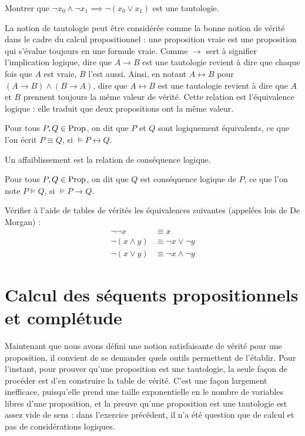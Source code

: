 \begin{exercise}
  Montrer que $\lnot x_0\land \lnot x_1 \implies \lnot (x_0\lor x_1)$ est une
  tautologie.
\end{exercise}

La notion de tautologie peut être considérée comme la bonne notion de vérité
dans le cadre du calcul propositionnel : une proposition vraie est une
proposition qui s'évalue toujours en une formule vraie. Comme $\to$ sert à
signifier l'implication logique, dire que $A \to B$ est une tautologie revient à
dire que chaque fois que $A$ est vraie, $B$ l'est aussi. Ainsi, en notant
$A \leftrightarrow B$ pour $(A \to B) \land (B \to A)$, dire que
$A \leftrightarrow B$ est une tautologie revient à dire que $A$ et $B$ prennent
toujours la même valeur de vérité. Cette relation est l'équivalence logique :
elle traduit que deux propositions ont la même valeur.

\begin{definition}
  Pour tous $P,Q\in\operatorname{Prop}$, on dit que $P$ et $Q$ sont logiquement équivalents,
  ce que l'on écrit $P\equiv Q$, si $\models P \leftrightarrow Q$.
\end{definition}

Un affaiblissement est la relation de conséquence logique.

\begin{definition}
  Pour tous $P,Q\in\operatorname{Prop}$, on dit que $Q$ est conséquence logique de $P$, ce que
  l'on note $P\vDash Q$, si $\models P\to Q$.
\end{definition}

\begin{exercise}
  Vérifier à l'aide de tables de vérités les équivalences suivantes (appelées
  lois de De Morgan) :
  \begin{align*}
    \lnot\lnot x &\equiv x\\
    \lnot (x \land y) &\equiv \lnot x \lor \lnot y\\
    \lnot (x \lor y) &\equiv \lnot x \land \lnot y
  \end{align*}
\end{exercise}

\section[Séquents propositionnels]{Calcul des séquents propositionnels et
  complétude}

Maintenant que nous avons défini une notion satisfaisante de vérité pour une
proposition, il convient de se demander quels outils permettent de l'établir.
Pour l'instant, pour prouver qu'une proposition est une tautologie, la seule
façon de procéder est d'en construire la table de vérité. C'est une façon
largement inefficace, puisqu'elle prend une taille exponentielle en le nombre de
variables libres d'une proposition, et la preuve qu'une proposition est une
tautologie est assez vide de sens : dans l'exercice précédent, il n'a été
question que de calcul et pas de considérations logiques.

